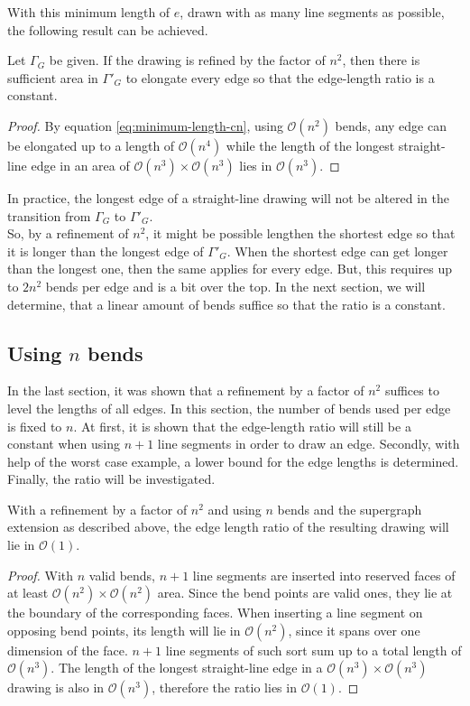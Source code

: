 With this minimum length of $e$, drawn with as many line segments as possible, the following result can be achieved.
\begin{theorem}
	Let $\Gamma_G$ be given. If the drawing is refined by the factor of $n^2$, then there is sufficient area in $\Gamma'_G$ to elongate every edge so that the edge-length ratio is a constant.
\end{theorem}
\begin{proof}
	By equation \ref{eq:minimum-length-cn}, using $\mathcal{O}(n^2)$ bends, any edge can be elongated up to a length of $\mathcal{O}(n^4)$ while the length of the longest straight-line edge in an area of $\mathcal{O}(n^3)\times\mathcal{O}(n^3)$ lies in $\mathcal{O}(n^3)$.
\end{proof}

\bigskip
In practice, the longest edge of a straight-line drawing will not be altered in the transition from $\Gamma_G$ to $\Gamma'_G$.\\
So, by a refinement of $n^2$, it might be possible lengthen the shortest edge so that it is longer than the longest edge of $\Gamma'_G$. When the shortest edge can get longer than the longest one, then the same applies for every edge. But, this requires up to $2n^2$ bends per edge and is a bit over the top. In the next section, we will determine, that a linear amount of bends suffice so that the ratio is a constant.
\subsection{Using $n$ bends}

In the last section, it was shown that a refinement by a factor of $n^2$ suffices to level the lengths of all edges. In this section, the number of bends used per edge is fixed to $n$. At first, it is shown that the edge-length ratio will still be a constant when using $n+1$ line segments in order to draw an edge. Secondly, with help of the worst case example, a lower bound for the edge lengths is determined. Finally, the ratio will be investigated.
\begin{lemma}
\end{lemma}
With a refinement by a factor of $n^2$ and using $n$ bends and the supergraph extension as described above, the edge length ratio of the resulting drawing will lie in $\mathcal{O}(1)$.
\begin{proof}
	With $n$ valid bends, $n+1$ line segments are inserted into reserved faces of at least $\mathcal{O}(n^2)\times \mathcal{O}(n^2)$ area. Since the bend points are valid ones, they lie at the boundary of the corresponding faces. When inserting a line segment on opposing bend points, its length will lie in $\mathcal{O}(n^2)$, since it spans over one dimension of the face. $n+1$ line segments of such sort sum up to a total length of $\mathcal{O}(n^3)$. The length of the longest straight-line edge in a $\mathcal{O}(n^3)\times\mathcal{O}(n^3)$ drawing is also in $\mathcal{O}(n^3)$, therefore the ratio lies in $\mathcal{O}(1)$.
\end{proof}

